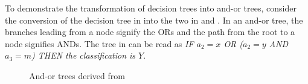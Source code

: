 To demonstrate the transformation of decision trees into and-or trees, consider the conversion of the decision tree in  into the two  in  and .  In an and-or tree, the branches leading from a node signify the ORs and the path from the root  to a node signifies ANDs.  The tree in  can be read as {\it IF $a_2 = x$ OR ($a_2 = y$ AND $a_3 = m$) THEN the classification is $Y$}.

\begin{figure}
\centering
{}
\caption{And-or trees derived from }
\end{figure}



